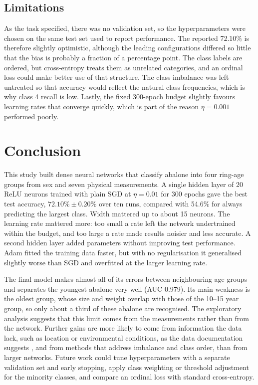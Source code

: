 \documentclass[conference]{IEEEtran}
\begin{document}
\subsection{Limitations}

As the task specified, there was no validation set, so the hyperparameters were chosen on the same test set used to report performance. The reported 72.10\% is therefore slightly optimistic, although the leading configurations differed so little that the bias is probably a fraction of a percentage point. The class labels are ordered, but cross-entropy treats them as unrelated categories, and an ordinal loss could make better use of that structure. The class imbalance was left untreated so that accuracy would reflect the natural class frequencies, which is why class 4 recall is low. Lastly, the fixed 300-epoch budget slightly favours learning rates that converge quickly, which is part of the reason $\eta = 0.001$ performed poorly.

\section{Conclusion}\label{sec:conclusion}

This study built dense neural networks that classify abalone into four ring-age groups from sex and seven physical measurements. A single hidden layer of 20 ReLU neurons trained with plain SGD at $\eta = 0.01$ for 300 epochs gave the best test accuracy, $72.10\% \pm 0.20\%$ over ten runs, compared with 54.6\% for always predicting the largest class. Width mattered up to about 15 neurons. The learning rate mattered more: too small a rate left the network undertrained within the budget, and too large a rate made results noisier and less accurate. A second hidden layer added parameters without improving test performance. Adam fitted the training data faster, but with no regularisation it generalised slightly worse than SGD and overfitted at the larger learning rate.

The final model makes almost all of its errors between neighbouring age groups and separates the youngest abalone very well (AUC 0.979). Its main weakness is the oldest group, whose size and weight overlap with those of the 10--15 year group, so only about a third of these abalone are recognised. The exploratory analysis suggests that this limit comes from the measurements rather than from the network. Further gains are more likely to come from information the data lack, such as location or environmental conditions, as the data documentation suggests \cite{uci}, and from methods that address imbalance and class order, than from larger networks. Future work could tune hyperparameters with a separate validation set and early stopping, apply class weighting or threshold adjustment for the minority classes, and compare an ordinal loss with standard cross-entropy.


\end{document}
